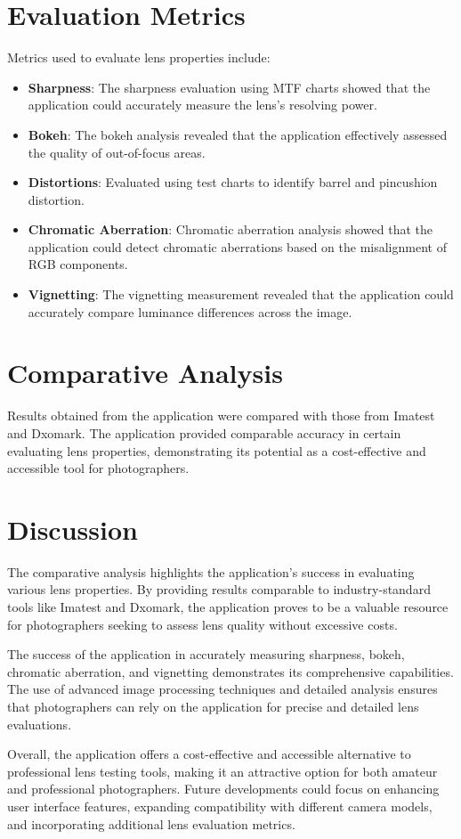 \section{Evaluation Metrics}
Metrics used to evaluate lens properties include:
\begin{itemize}
    \item \textbf{Sharpness}: The sharpness evaluation using MTF charts showed that the application could accurately measure the lens's resolving power.
    \item \textbf{Bokeh}: The bokeh analysis revealed that the application effectively assessed the quality of out-of-focus areas.
    \item \textbf{Distortions}: Evaluated using test charts to identify barrel and pincushion distortion.
    \item \textbf{Chromatic Aberration}: Chromatic aberration analysis showed that the application could detect chromatic aberrations based on the misalignment of RGB components.
    \item \textbf{Vignetting}: The vignetting measurement revealed that the application could accurately compare luminance differences across the image.
\end{itemize}

\section{Comparative Analysis}
Results obtained from the application were compared with those from Imatest and Dxomark. The application provided comparable accuracy in certain evaluating lens properties, demonstrating its potential as a cost-effective and accessible tool for photographers.

\section{Discussion}

The comparative analysis highlights the application's success in evaluating various lens properties. By providing results comparable to industry-standard tools like Imatest and Dxomark, the application proves to be a valuable resource for photographers seeking to assess lens quality without excessive costs.

The success of the application in accurately measuring sharpness, bokeh, chromatic aberration, and vignetting demonstrates its comprehensive capabilities. The use of advanced image processing techniques and detailed analysis ensures that photographers can rely on the application for precise and detailed lens evaluations.

Overall, the application offers a cost-effective and accessible alternative to professional lens testing tools, making it an attractive option for both amateur and professional photographers. Future developments could focus on enhancing user interface features, expanding compatibility with different camera models, and incorporating additional lens evaluation metrics.
